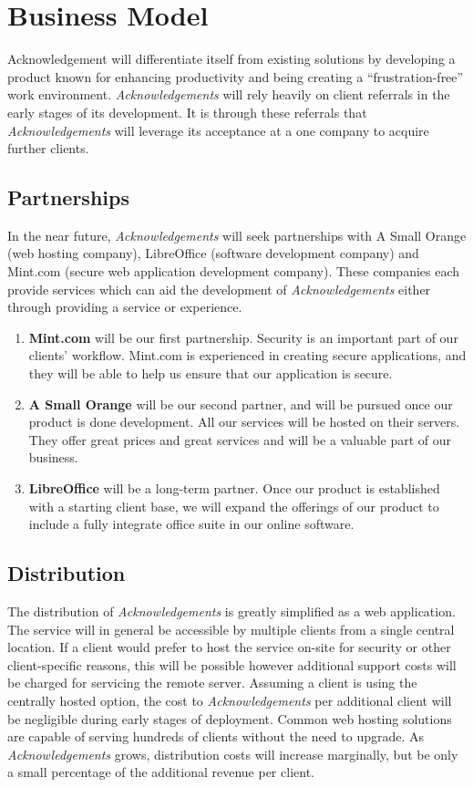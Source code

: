 \section{Business Model}
Acknowledgement will differentiate itself from existing solutions by developing a product known for enhancing productivity and being creating a ``frustration-free'' work environment. {\it Acknowledgements} will rely heavily on client referrals in the early stages of its development. It is through these referrals that {\it Acknowledgements} will leverage its acceptance at a one company to acquire further clients.

\subsection{Partnerships}
In the near future, {\it Acknowledgements} will seek partnerships with A Small Orange (web hosting company), LibreOffice (software development company) and Mint.com (secure web application development company). These companies each provide services which can aid the development of {\it Acknowledgements} either through providing a service or experience.

\begin{enumerate}
  \item {\bf Mint.com} will be our first partnership. Security is an important part of our clients' workflow. Mint.com is experienced in creating secure applications, and they will be able to help us ensure that our application is secure.
  \item {\bf A Small Orange} will be our second partner, and will be pursued once our product is done development. All our services will be hosted on their servers. They offer great prices and great services and will be a valuable part of our business.
  \item {\bf LibreOffice} will be a long-term partner. Once our product is established with a starting client base, we will expand the offerings of our product to include a fully integrate office suite in our online software.
\end{enumerate}

\subsection{Distribution}
The distribution of {\it Acknowledgements} is greatly simplified as a web application. The service will in general be accessible by multiple clients from a single central location. If a client would prefer to host the service on-site for security or other client-specific reasons, this will be possible however additional support costs will be charged for servicing the remote server. Assuming a client is using the centrally hosted option, the cost to {\it Acknowledgements} per additional client will be negligible during early stages of deployment. Common web hosting solutions are capable of serving hundreds of clients without the need to upgrade. As {\it Acknowledgements} grows, distribution costs will increase marginally, but be only a small percentage of the additional revenue per client.

